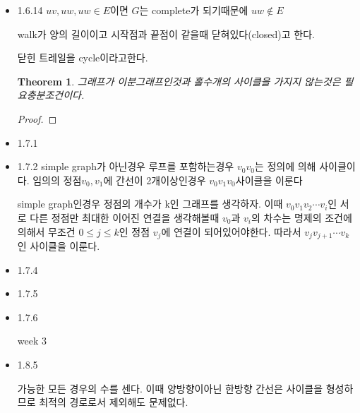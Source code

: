 \documentclass{oblivoir}
\newtheorem{theorem}{Theorem}[section]
\begin{document}
\begin{itemize}
    \item 1.6.14
    $uv, uw, uw \in E $이면 $G$는 complete가 되기때문에 $uw \notin E$

    \begin{dfn}[cycle]
    walk가 양의 길이이고 시작점과 끝점이 같을때 닫혀있다(closed)고 한다. 

    닫힌 트레일을 cycle이라고한다.
    \end{dfn}

    \begin{theorem}
        그래프가 이분그래프인것과 홀수개의 사이클을 가지지 않는것은 필요충분조건이다.
    \end{theorem}
    \begin{proof}
        
    \end{proof}

    \item 1.7.1
    \item 1.7.2
    simple graph가 아닌경우
          루프를 포함하는경우 $v_0v_0$는 정의에 의해 사이클이다.
               임의의 정점$v_0, v_1$에 간선이 2개이상인경우            $v_0v_1v_0$사이클을 이룬다
         
        simple graph인경우
            정점의 개수가 k인 그래프를 생각하자. 이때 $v_0v_1v_2 \cdots v_i$인 서로 다른 정점만 최대한 이어진 연결을 생각해볼때 $v_0$과 $v_i$의 차수는 명제의 조건에의해서 무조건 $0 \le j \le k$인 정점 $v_j$에 연결이 되어있어야한다. 따라서 $v_{j}v_{j+1} \cdots v_k$인 사이클을 이룬다.
    
    \item 1.7.4
    \item 1.7.5
    \item 1.7.6
    
    week 3
     

    \item 1.8.5
    
    가능한 모든 경우의 수를 센다. 이때 양방향이아닌 한방향 간선은 사이클을 형성하므로 최적의 경로로서 제외해도 문제없다.


\end{itemize}
\end{document}
